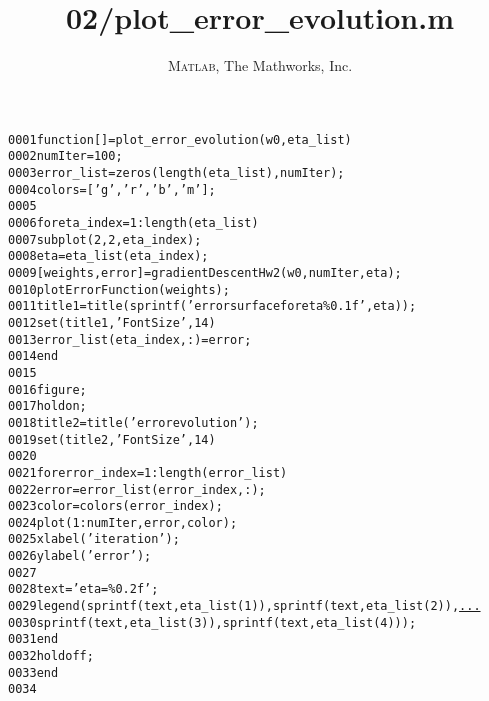 \documentclass[a4paper,10pt]{article}
\title{02/plot_error_evolution.m}
\author{\textsc{Matlab}, The Mathworks, Inc.}
\begin{document}
\maketitle
\begin{alltt}
0001 \textcolor{keyword}{function} [ ] = plot\_error\_evolution( w0, eta\_list )
0002     numIter = 100;
0003     error\_list = zeros(length(eta\_list), numIter);
0004     colors = [\textcolor{string}{'g'}, \textcolor{string}{'r'}, \textcolor{string}{'b'}, \textcolor{string}{'m'}];
0005     
0006     \textcolor{keyword}{for} eta\_index = 1:length(eta\_list)
0007         subplot(2, 2, eta\_index);
0008         eta = eta\_list(eta\_index);
0009         [weights, error] = gradientDescentHw2(w0, numIter, eta);
0010         plotErrorFunction(weights);
0011         title1 = title(sprintf(\textcolor{string}{'error surface for eta \%0.1f'}, eta));
0012         set(title1, \textcolor{string}{'FontSize'}, 14)
0013         error\_list(eta\_index, :) = error;
0014     \textcolor{keyword}{end}
0015 
0016     figure;
0017     hold on;
0018     title2 = title(\textcolor{string}{'error evolution'});
0019     set(title2, \textcolor{string}{'FontSize'}, 14)
0020     
0021     \textcolor{keyword}{for} error\_index = 1:length(error\_list)
0022         error = error\_list(error\_index, :);
0023         color = colors(error\_index);
0024         plot(1:numIter, error, color);
0025         xlabel(\textcolor{string}{'iteration'});
0026         ylabel(\textcolor{string}{'error'});
0027 
0028         text = \textcolor{string}{'eta=\%0.2f'};
0029         legend(sprintf(text, eta\_list(1)), sprintf(text, eta\_list(2)), \textcolor{keyword}{\underline{...}}
0030         sprintf(text, eta\_list(3)), sprintf(text, eta\_list(4)) );
0031     \textcolor{keyword}{end}
0032     hold off;
0033 \textcolor{keyword}{end}
0034 
\end{alltt}
\end{document}
